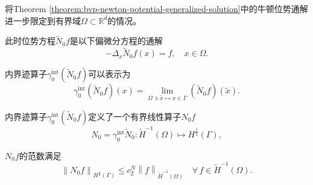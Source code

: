 \begin{corollary}
\label{corollary:bvp-newton-potential-generalized-solution}
将Theorem \ref{theorem:bvp-newton-potential-generalized-solution}中的牛顿位势通解进一步限定到有界域$\Omega \subset \mathbb{R}^{d}$的情况。

此时位势方程$\widetilde{N}_{0}f$是以下偏微分方程的通解
\begin{equation*}
  - \Delta_{x} \widetilde{N}_{0}f(x) = f, \quad x \in \Omega.
\end{equation*}

内界迹算子$\gamma_{0}^{\text{int}}(\widetilde{N}_{0} f)$可以表示为
\begin{equation}
  \label{eq:bvp-newton-gen-trace-operator}
  \gamma_{0}^{\text{int}}(\widetilde{N}_{0} f)(x) =
  \lim_{\Omega \ni \widetilde{x} \mapsto x \in \Gamma}
  \left( \widetilde{N}_{0} f\right) \left( \widetilde{x} \right).
\end{equation}

内界迹算子$\gamma_{0}^{\text{int}}(\widetilde{N}_{0} f)$定义了一个有界线性算子$N_0 f$
\begin{equation}
\label{eq:bvp-newton-gen-n0}
N_0 = \gamma_{0}^{\text{int}} \widetilde{N}_{0}: \widetilde{H}^{-1}(\Omega) \mapsto H^{\frac{1}{2}}(\Gamma),
\end{equation}

$N_{0} f$的范数满足
\begin{equation}
  \label{eq:bvp-newton-gen-n0-norm}
  \left\| N_{0} f \right\|_{H^{\frac{1}{2}}(\Gamma)}
  \le c_{2}^{N} \left\| f \right\|_{\widetilde{H}^{-1}(\Omega)} \quad \forall \, f \in \widetilde{H}^{-1}(\Omega).
\end{equation}
\end{corollary}

